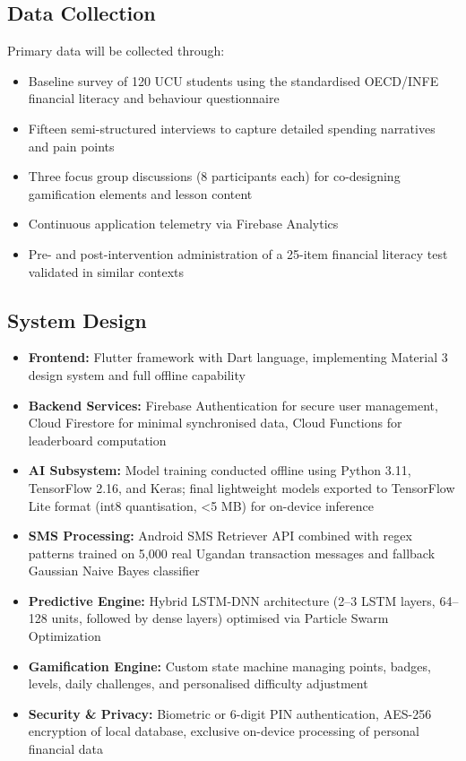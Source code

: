 \documentclass[12pt]{article}
\begin{document}
\subsection{\large Data Collection}
Primary data will be collected through:
\begin{itemize}
    \item Baseline survey of 120 UCU students using the standardised OECD/INFE financial literacy and behaviour questionnaire
    \item Fifteen semi-structured interviews to capture detailed spending narratives and pain points
    \item Three focus group discussions (8 participants each) for co-designing gamification elements and lesson content
    \item Continuous application telemetry via Firebase Analytics
    \item Pre- and post-intervention administration of a 25-item financial literacy test validated in similar contexts
\end{itemize}

\subsection{\large System Design}
\begin{itemize}
    \item \textbf{Frontend:} Flutter framework with Dart language, implementing Material 3 design system and full offline capability
    \item \textbf{Backend Services:} Firebase Authentication for secure user management, Cloud Firestore for minimal synchronised data, Cloud Functions for leaderboard computation
    \item \textbf{AI Subsystem:} Model training conducted offline using Python 3.11, TensorFlow 2.16, and Keras; final lightweight models exported to TensorFlow Lite format (int8 quantisation, <5 MB) for on-device inference
    \item \textbf{SMS Processing:} Android SMS Retriever API combined with regex patterns trained on 5,000 real Ugandan transaction messages and fallback Gaussian Naive Bayes classifier
    \item \textbf{Predictive Engine:} Hybrid LSTM-DNN architecture (2–3 LSTM layers, 64–128 units, followed by dense layers) optimised via Particle Swarm Optimization
    \item \textbf{Gamification Engine:} Custom state machine managing points, badges, levels, daily challenges, and personalised difficulty adjustment
    \item \textbf{Security \& Privacy:} Biometric or 6-digit PIN authentication, AES-256 encryption of local database, exclusive on-device processing of personal financial data
\end{itemize}
\end{document}

